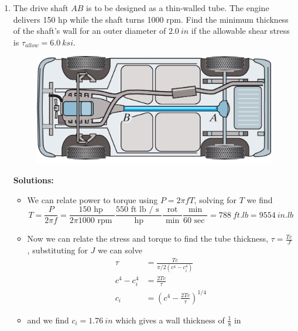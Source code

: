 \documentclass[12pt, oneside]{article}
\let\US\SI
\begin{document}
\begin{enumerate}
	\item %
		The drive shaft $AB$ is to be designed as a thin-walled tube.
		The engine delivers 150 hp while the shaft turns 1000 rpm.
		Find the minimum thickness of the shaft's wall for an outer diameter of $\US{2.0}{in}$ if the allowable shear stress is $\tau_{allow}=\US{6.0}{ksi}$.
		\begin{figure}[H]
			\centering
			\includegraphics[width=0.6\linewidth]{5-28}
		\end{figure}
		\textbf{Solutions:}
		\begin{itemize}
			\item We can relate power to torque using $P = 2\pi f T$, solving for $T$ we find
				\begin{equation*}
					T = \frac{P}{2\pi f} = \frac{ 150 \text{ hp } }{ 2 \pi 1000 \text{ rpm } } \frac{ 550 \text{ ft lb / s } }{ \text { hp } } \frac{ \text{ rot } }{ \text{ min } } \frac{ \text{ min } }{ 60 \text{ sec } } = \US{788}{ft.lb} = \US{9554}{in.lb}
				\end{equation*}
			\item Now we can relate the stress and torque to find the tube thickness, $\tau = \frac{Tc}{J}$, substituting for $J$ we can solve
				\begin{align*}
					\tau &= \frac{Tc}{\pi/2 (c^4 - c_i^4)}\\
					c^4 - c_i^4 &= \frac{2 T c}{\tau}\\
					c_i &= \left( c^4 - \frac{2 T c}{\tau} \right)^{1/4}
				\end{align*}
			\item and we find $c_i = \US{1.76}{in}$ which gives a wall thickness of $\frac{1}{8}\text{ in}$
		\end{itemize}


\end{enumerate}
\end{document}
